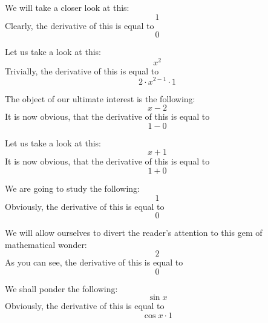 \documentclass{article}
\begin{document}
We will take a closer look at this:
\begin{equation}
1 
\end{equation}
Clearly, the derivative of this is equal to
\begin{equation}
0 
\end{equation}

Let us take a look at this:
\begin{equation}
x ^{2 } 
\end{equation}
Trivially, the derivative of this is equal to
\begin{equation}
2 \cdot x ^{2 - 1 } \cdot 1 
\end{equation}

The object of our ultimate interest is the following:
\begin{equation}
x - 2 
\end{equation}
It is now obvious, that the derivative of this is equal to
\begin{equation}
1 - 0 
\end{equation}

Let us take a look at this:
\begin{equation}
x + 1 
\end{equation}
It is now obvious, that the derivative of this is equal to
\begin{equation}
1 + 0 
\end{equation}

We are going to study the following:
\begin{equation}
1 
\end{equation}
Obviously, the derivative of this is equal to
\begin{equation}
0 
\end{equation}

We will allow ourselves to divert the reader's attention to this gem of mathematical wonder:
\begin{equation}
2 
\end{equation}
As you can see, the derivative of this is equal to
\begin{equation}
0 
\end{equation}

We shall ponder the following:
\begin{equation}
\sin x 
\end{equation}
Obviously, the derivative of this is equal to
\begin{equation}
\cos x \cdot 1 
\end{equation}
\end{document}
